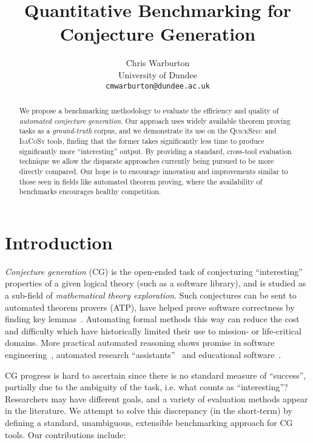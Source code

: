 \documentclass[]{default}
\title{Quantitative Benchmarking for Conjecture Generation}
\author{
          Chris Warburton \\
      University of Dundee \\
      \texttt{cmwarburton@dundee.ac.uk}
    }
\date{}
\begin{document}
\maketitle
\begin{abstract}
  We propose a benchmarking methodology to evaluate the efficiency and quality
  of \emph{automated conjecture generation}. Our approach uses widely available
  theorem proving tasks as a \emph{ground-truth} corpus, and we demonstrate its
  use on the \textsc{QuickSpec} and \textsc{IsaCoSy} tools, finding that the
  former takes significantly less time to produce significantly more
  ``interesting'' output. By providing a standard, cross-tool evaluation
  technique we allow the disparate approaches currently being pursued to be more
  directly compared. Our hope is to encourage innovation and improvements
  similar to those seen in fields like automated theorem proving, where the
  availability of benchmarks encourages healthy competition.
\end{abstract}

\section{Introduction}\label{introduction}

\emph{Conjecture generation} (CG) is the open-ended task of conjecturing
``interesting'' properties of a given logical theory (such as a software
library), and is studied as a sub-field of \emph{mathematical theory
  exploration}. Such conjectures can be sent to automated theorem provers (ATP),
have helped prove software correctness by finding key
lemmas~\cite{Claessen.Johansson.Rosen.ea:2013}. Automating formal methods this
way can reduce the cost and difficulty which have historically limited their use
to mission- or life-critical domains. More practical automated reasoning shows
promise in software
engineering~\cite{McKinna:2006,chlipala2011certified,Xi2003}, automated research
``assistants''~\cite{McCarthy_Programs59,lenat:77,benzmuller1997omegamega} and
educational software~\cite{conf/ijcai/TrybulecB85,hendriks2010teaching}.

CG progress is hard to ascertain since there is no standard measure of
``success'', partially due to the ambiguity of the task, i.e. what counts as
``interesting''? Researchers may have different goals, and a variety of
evaluation methods appear in the literature. We attempt to solve this
discrepancy (in the short-term) by defining a standard, unambiguous, extensible
benchmarking approach for CG tools. Our contributions include:
\end{document}
